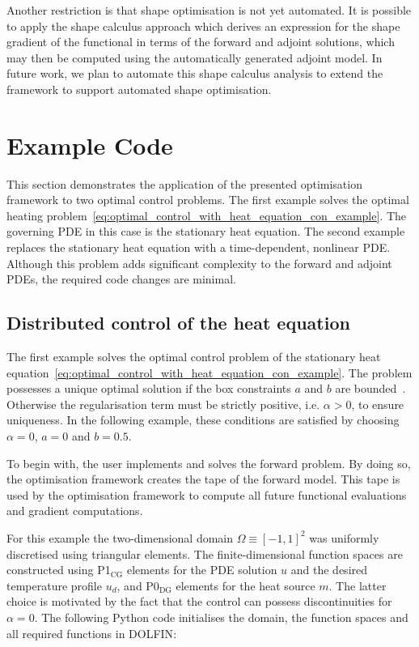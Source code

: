 \documentclass[prodmode,acmtoms]{acmsmall}
\newcommand{\dolfin}{{\mbox{DOLFIN}}\xspace}
\newcommand{\ponecg}{\mbox{P1$_\textrm{CG}$}\xspace}
\newcommand{\pzerodg}{\mbox{P0$_\textrm{DG}$}\xspace}
\begin{document}
Another restriction is that shape optimisation is not yet automated. It is possible to apply the shape
calculus approach \cite{schmidt2010,schmidt2011b} which derives an expression for the shape gradient
of the functional in terms of the forward and adjoint solutions, which may then be computed using the
automatically generated adjoint model. In future work, we plan to automate this shape calculus analysis
to extend the framework to support automated shape optimisation.

\section{Example Code}\label{sec:examples}
This section demonstrates the application of the presented optimisation framework to two optimal control problems.
The first example solves the optimal heating problem~\eqref{eq:optimal_control_with_heat_equation_con_example}. 
The governing PDE in this case is the stationary heat equation.
The second example replaces the stationary heat equation with a time-dependent, nonlinear PDE. 
Although this problem adds significant complexity to the forward and adjoint PDEs, 
the required code changes are minimal.

\subsection{Distributed control of the heat equation}\label{distributed_control_of_the_heat_equation}


The first example solves the optimal control problem of the stationary heat equation~\eqref{eq:optimal_control_with_heat_equation_con_example}.
The problem possesses a unique optimal solution if the box constraints $a$ and $b$ are bounded~\cite[chapter 2.5.1]{troeltzsch2005}.
Otherwise the regularisation term must be strictly positive, i.e. $\alpha > 0$, to ensure uniqueness.
In the following example, these conditions are satisfied by choosing $\alpha = 0$, $a = 0$ and $b = 0.5$.

To begin with, the user implements and solves the forward problem.
By doing so, the optimisation framework creates the tape of the forward model.
This tape is used by the optimisation framework to compute all future functional evaluations and gradient computations. 

For this example the two-dimensional domain $\Omega \equiv [-1, 1]^2$ was uniformly discretised using triangular elements. 
The finite-dimensional function spaces are constructed using \ponecg elements for the PDE solution $u$ and the desired temperature profile $u_d$, and \pzerodg elements for the heat source $m$.
The latter choice is motivated by the fact that the control can possess discontinuities for $\alpha = 0$.
The following Python code initialises the domain, the function spaces and all required functions in \dolfin:
\end{document}

